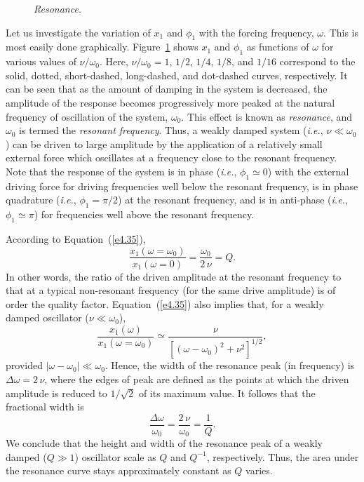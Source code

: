 \begin{figure}
\epsfysize=2.25in
\centerline{}
\caption{\em Resonance.}\label{fres}   
\end{figure}
Let us investigate the variation of $x_1$ and $\phi_1$ with the forcing frequency,
$\omega$.  This is most easily done graphically. Figure~\ref{fres} shows $x_1$ and $\phi_1$ as functions of $\omega$ for
various values of $\nu/\omega_0$. Here, $\nu/\omega_0 = 1$, $1/2$, $1/4$, $1/8$, and $1/16$ correspond to the solid, dotted, short-dashed, long-dashed,
and dot-dashed curves, respectively. It can be seen that as the amount of
damping in the system is decreased, the amplitude of the response becomes
progressively more peaked at the natural frequency of oscillation of the system, $\omega_0$. This effect is known as {\em resonance}, and
$\omega_0$ is termed the {\em resonant frequency}. Thus,
a weakly damped system ({\em i.e.}, $\nu\ll \omega_0$) can be driven to large amplitude by the application of a relatively
small external force which oscillates at a frequency close to the resonant frequency. Note that the response of the system is in phase ({\em i.e.}, $\phi_1\simeq 0$)
with the external driving force for driving frequencies well below the resonant
frequency, is in phase quadrature
({\em i.e.}, $\phi_1=\pi/2$)
at the resonant frequency, and is in anti-phase ({\em i.e.}, $\phi_1\simeq \pi$)
for frequencies well above the resonant frequency.

According to Equation~(\ref{e4.35}),
\begin{equation}
\frac{x_1(\omega=\omega_0)}{x_1(\omega = 0)} = \frac{\omega_0}{2\,\nu}
=Q.
\end{equation}
In other words, the ratio of the driven amplitude at the resonant frequency
to that at a typical non-resonant frequency (for the same drive amplitude)
is of order the quality factor. Equation~(\ref{e4.35}) also implies that,
for a weakly damped oscillator ($\nu\ll \omega_0$),
\begin{equation}
\frac{x_1(\omega)}{x_1(\omega=\omega_0)}\simeq \frac{\nu}{[(\omega-\omega_0)^2 + \nu^2]^{1/2}},
\end{equation}
provided $|\omega-\omega_0|\ll \omega_0$. 
Hence, the width of the resonance
peak (in frequency) is $\Delta\omega = 2\,\nu$, where the edges of peak are defined as the points at which the driven amplitude
is reduced to $1/\sqrt{2}$ of its maximum value. It follows that the
fractional width is
\begin{equation}
\frac{\Delta \omega}{\omega_0} = \frac{2\,\nu}{\omega_0} = \frac{1}{Q}.
\end{equation}
We conclude that the
height and width of the resonance peak of a weakly damped ($Q\gg 1$) oscillator scale as $Q$ and
$Q^{-1}$, respectively. Thus, the area under the resonance curve stays
approximately constant as $Q$ varies. 
 
